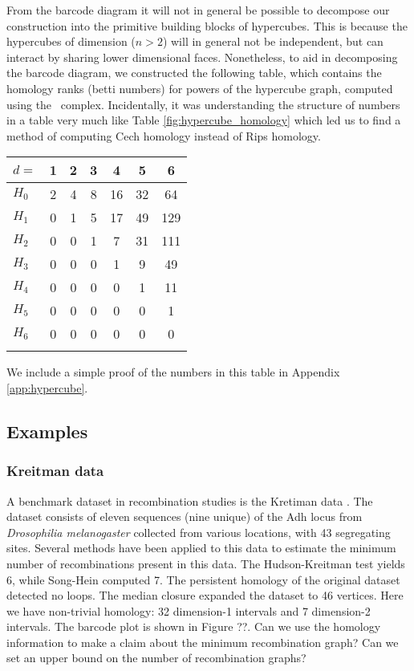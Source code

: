 From the barcode diagram it will not in general be possible to decompose our construction into the primitive building blocks of hypercubes.
This is because the hypercubes of dimension ($n>2$) will in general not be independent, but can interact by sharing lower dimensional faces.
Nonetheless, to aid in decomposing the barcode diagram, we constructed the following table, which contains the homology ranks (betti numbers) for powers of the hypercube graph, computed using the \Cech\ complex.
Incidentally, it was understanding the structure of numbers in a table very much like Table \ref{fig:hypercube_homology} which led us to find a method of computing Cech homology instead of Rips homology.

\begin{center}
\begin{tabular}{lcccccc}
$d=$    & 1 & 2 & 3 &  4 &  5 & 6\\
\toprule
$H_{0}$ & 2 & 4 & 8 & 16 & 32 & 64\\
\midrule
$H_{1}$ & 0 & 1 & 5 & 17 & 49 & 129\\
\midrule
$H_{2}$ & 0 & 0 & 1 &  7 & 31 & 111\\
\midrule
$H_{3}$ & 0 & 0 & 0 &  1 &  9 & 49\\
\midrule
$H_{4}$ & 0 & 0 & 0 & 0 &  1 & 11\\
\midrule
$H_{5}$ & 0 & 0 & 0 & 0 &  0 &  1\\
\midrule
$H_{6}$ & 0 & 0 & 0 & 0 & 0 &  0\\
\bottomrule
\label{fig:hypercube_homology}
\end{tabular}
\end{center}

We include a simple proof of the numbers in this table in Appendix \ref{app:hypercube}.

\subsection{Examples}

\subsubsection{Kreitman data}

A benchmark dataset in recombination studies is the Kretiman data \citep{Kreitman:1983}.
The dataset consists of eleven sequences (nine unique) of the Adh locus from \emph{Drosophilia melanogaster} collected from various locations, with 43 segregating sites.
Several methods have been applied to this data to estimate the minimum number of recombinations present in this data.
The Hudson-Kreitman test yields 6, while Song-Hein computed 7.
The persistent homology of the original dataset detected no loops.
The median closure expanded the dataset to 46 vertices.
Here we have non-trivial homology: 32 dimension-1 intervals and 7 dimension-2 intervals.
The barcode plot is shown in Figure ??.
Can we use the homology information to make a claim about the minimum recombination graph?
Can we set an upper bound on the number of recombination graphs?

